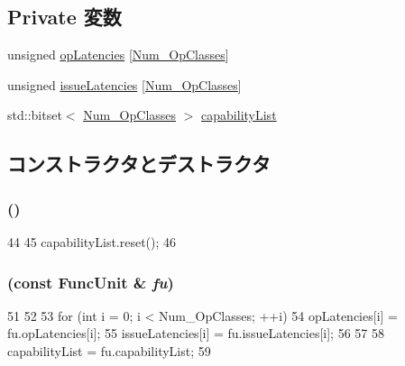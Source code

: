\subsection*{Private 変数}
\begin{DoxyCompactItemize}
\item 
unsigned \hyperlink{classFuncUnit_a28940a20f270bc01f3993dd2e8d4517f}{opLatencies} \mbox{[}\hyperlink{op__class_8hh_a5e0e351c8afca390ef0a05a7dbb68b1b}{Num\_\-OpClasses}\mbox{]}
\item 
unsigned \hyperlink{classFuncUnit_ac2a9e9df0d9c429f6de7cc0d448fdeb3}{issueLatencies} \mbox{[}\hyperlink{op__class_8hh_a5e0e351c8afca390ef0a05a7dbb68b1b}{Num\_\-OpClasses}\mbox{]}
\item 
std::bitset$<$ \hyperlink{op__class_8hh_a5e0e351c8afca390ef0a05a7dbb68b1b}{Num\_\-OpClasses} $>$ \hyperlink{classFuncUnit_a7539c2a37351472e37845fdde96e3d37}{capabilityList}
\end{DoxyCompactItemize}


\subsection{コンストラクタとデストラクタ}
\hypertarget{classFuncUnit_acb9265324e00c03e631bb895c2b8750c}{
\subsubsection[{FuncUnit}]{ ()}}
\label{classFuncUnit_acb9265324e00c03e631bb895c2b8750c}



\begin{DoxyCode}
44 {
45     capabilityList.reset();
46 }
\end{DoxyCode}
\hypertarget{classFuncUnit_aece4c05e748fed50ee88c7c21bf94ab1}{
\subsubsection[{FuncUnit}]{ (const {\bf FuncUnit} \& {\em fu})}}
\label{classFuncUnit_aece4c05e748fed50ee88c7c21bf94ab1}



\begin{DoxyCode}
51 {
52 
53     for (int i = 0; i < Num_OpClasses; ++i) {
54         opLatencies[i] = fu.opLatencies[i];
55         issueLatencies[i] = fu.issueLatencies[i];
56     }
57 
58     capabilityList = fu.capabilityList;
59 }
\end{DoxyCode}


